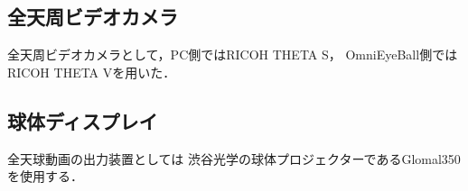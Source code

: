 



\subsection*{全天周ビデオカメラ}
全天周ビデオカメラとして，PC側ではRICOH THETA S，
OmniEyeBall側ではRICOH THETA Vを用いた．

\subsection*{球体ディスプレイ}
全天球動画の出力装置としては
渋谷光学の球体プロジェクターであるGlomal350を使用する．